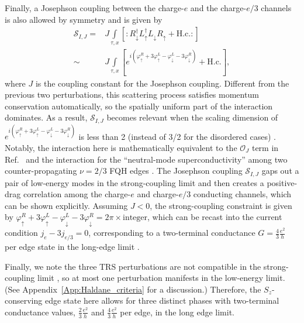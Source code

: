 \documentclass[aps,prx,amsmath,superscriptaddress,twocolumn,bibnotes,longbibliography,floatfix]{revtex4-2}
\begin{document}
	Finally, a Josephson coupling between the charge-$e$ and the charge-$e/3$ channels \cite{ChouYZ2024} is also allowed by symmetry and is given by
	\begin{subequations}\label{Eq:S_I_J}
		\begin{align}
			\mathcal{S}_{I,J}=&J\int\limits_{\tau,x}\left[:R^{\dagger}_{\downarrow}L^{\dagger}_{\uparrow}L_{\downarrow}R_{\uparrow}+\text{H.c.}:\right]\\
			\sim&J\int\limits_{\tau,x}\left[e^{i\left(\varphi^R_{\uparrow}+3\varphi^L_{\uparrow}-\varphi^L_{\downarrow}-3\varphi^R_{\downarrow}\right)}+\text{H.c.}\right],
		\end{align}
	\end{subequations}
	where $J$ is the coupling constant for the Josephson coupling. Different from the previous two perturbations, this scattering process satisfies momentum conservation automatically, so the spatially uniform part of the interaction dominates. As a result, $\mathcal{S}_{I,J}$ becomes relevant when the scaling dimension of $e^{i\left(\varphi^R_{\uparrow}+3\varphi^L_{\uparrow}-\varphi^L_{\downarrow}-3\varphi^R_{\downarrow}\right)}$ is less than 2 (instead of 3/2 for the disordered cases) \cite{GiamarchiT2003,GogolinAO2004}. Notably, the interaction here is mathematically equivalent to the $\mathcal{O}_J$ term in Ref.~\cite{ChouYZ2024} and the interaction for the ``neutral-mode superconductivity'' among two counter-propagating $\nu=2/3$ FQH edges \cite{VayrynenJI2022}. The Josephson coupling $\mathcal{S}_{I,J}$ gaps out a pair of low-energy modes in the strong-coupling limit and then creates a positive-drag correlation among the charge-$e$ and charge-$e/3$ conducting channels, which can be shown explicitly. Assuming $J<0$, the strong-coupling constraint is given by $\varphi^R_{\uparrow}+3\varphi^L_{\uparrow}-\varphi^L_{\downarrow}-3\varphi^R_{\downarrow}=2\pi\times\text{integer}$, which can be recast into the current condition $j_e-3j_{e/3}=0$, corresponding to a two-terminal conductance $G=\frac{4}{3}\frac{e^2}{h}$ per edge state in the long-edge limit \cite{ChouYZ2024}.

	Finally, we note the three TRS perturbations are not compatible in the strong-coupling limit \cite{NeupertT2011a,MooreJE2002,XuC2006,ChouYZ2024}, so at most one perturbation manifests in the low-energy limit. (See Appendix~\ref{App:Haldane_criteria} for a discussion.)
	Therefore, the $S_z$-conserving edge state here allows for three distinct phases with two-terminal conductance values, $\frac{2}{3}\frac{e^2}{h}$ and $\frac{4}{3}\frac{e^2}{h}$ per edge, in the long edge limit.
\end{document}
